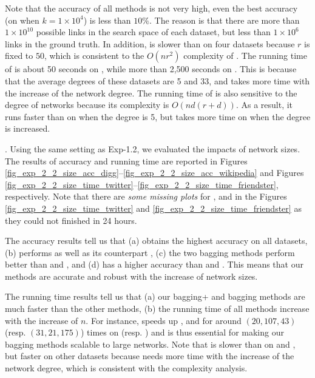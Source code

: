 Note that the accuracy of all methods is not very high, even the best
accuracy (\Biasedp on \Digg when $k = 1\times 10^4$) is less than $10\%$. The reason is that
there are more than $1\times 10^{10}$ possible links in the search space of each dataset,
but less than $1\times 10^6$ links in the ground truth.
In addition, \NMF is slower than \Aa on four datasets because $r$ is fixed to $50$,
which is consistent to the $O(nr^2)$ complexity of \NMF.
The running time of \Aa is about 50 seconds on \YouTube,
while more than 2,500 seconds on \Wikipedia.
This is because that the average degrees of these datasets are 5 and 33,
and \Aa takes more time with the increase of the network degree.
The running time of \BIGCLAM is also sensitive to the degree of networks because its complexity is $O(nd(r + d))$.
As a result, it runs faster than
\NMF on \YouTube when the degree is 5, but takes more time on \Wikipedia
when the degree is increased.








. Using the same setting as Exp-1.2, we
evaluated the impacts of network sizes. The results of accuracy and running time
are reported in Figures \ref{fig_exp_2_2_size_acc_digg}--\ref{fig_exp_2_2_size_acc_wikipedia}
and Figures \ref{fig_exp_2_2_size_time_twitter}--\ref{fig_exp_2_2_size_time_friendster}, respectively.
Note that there are {\em some missing plots} for \NMF, \Aa and
\BIGCLAM in the Figures \ref{fig_exp_2_2_size_time_twitter} and
\ref{fig_exp_2_2_size_time_friendster} as they could not finished in 24 hours.



The accuracy results tell us that (a) \Biased obtains the highest accuracy on all
datasets, (b) \Biasedp performs as well as its counterpart \Biased,
(c) the two bagging methods perform better than \Aa and \BIGCLAM,
and (d) \NMF has a higher accuracy than \Aa and \BIGCLAM. This means that
our methods are accurate and robust with the increase of network sizes.

The running time results tell us that (a) our bagging+ and bagging methods are much faster than the other methods,
(b) the running time of all methods increase with the increase of $n$. For
instance, \Biasedp speeds up \NMF, \Aa and \BIGCLAM for around $(20, 107, 43)$ (resp. $(31, 21, 175)$)
times on \Twitter (resp. \Friendster) and is thus essential for
making our bagging methods scalable to large networks. Note
that \NMF is slower than \BIGCLAM on \Digg and \YouTube,
but faster on other datasets because \BIGCLAM needs more time with
the increase of the network degree, which is consistent with the complexity analysis.



